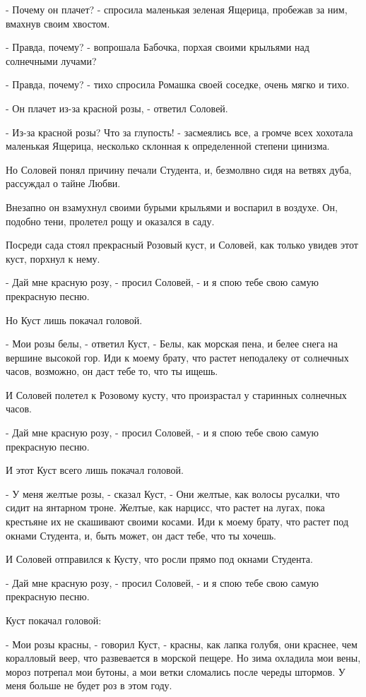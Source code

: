 \documentclass[a4paper]{article}
\theoremstyle{defin}
\theoremstyle{theorem}
\theoremstyle{prop}
\theoremstyle{lemma}
\theoremstyle{ex}
\theoremstyle{col}
\begin{document}
- Почему он плачет? - спросила маленькая зеленая Ящерица, пробежав за ним, вмахнув своим хвостом.

- Правда, почему? - вопрошала Бабочка, порхая своими крыльями над солнечными лучами?

- Правда, почему? - тихо спросила Ромашка своей соседке, очень мягко и тихо.

- Он плачет из-за красной розы, - ответил Соловей.

- Из-за красной розы? Что за глупость! - засмеялись все, а громче всех хохотала маленькая Ящерица, несколько склонная к определенной степени цинизма.

Но Соловей понял причину печали Студента, и, безмолвно сидя на ветвях дуба, рассуждал о тайне Любви.

Внезапно он взамухнул своими бурыми крыльями и воспарил в воздухе. Он, подобно тени, пролетел рощу и оказался в саду.

Посреди сада стоял прекрасный Розовый куст, и Соловей, как только увидев этот куст, порхнул к нему.

- Дай мне красную розу, - просил Соловей, - и я спою тебе свою самую прекрасную песню.

Но Куст лишь покачал головой.

- Мои розы белы, - ответил Куст, - Белы, как морская пена, и белее снега на вершине высокой гор. Иди к моему брату, что растет неподалеку от солнечных часов, возможно, он даст тебе то, что ты ищешь.

И Соловей полетел к Розовому кусту, что произрастал у старинных солнечных часов.

- Дай мне красную розу, - просил Соловей, - и я спою тебе свою самую прекрасную песню.

И этот Куст всего лишь покачал головой.

- У меня желтые розы, - сказал Куст, - Они желтые, как волосы русалки, что сидит на янтарном троне. Желтые, как нарцисс, что растет на лугах, пока крестьяне их не скашивают своими косами. Иди к моему брату, что растет под окнами Студента, и, быть может, он даст тебе, что ты хочешь.

И Соловей отправился к Кусту, что росли прямо под окнами Студента.

- Дай мне красную розу, - просил Соловей, - и я спою тебе свою самую прекрасную песню.

Куст покачал головой:

- Мои розы красны, - говорил Куст, - красны, как лапка голубя, они краснее, чем коралловый веер, что развевается в морской пещере. Но зима охладила мои вены, мороз потрепал мои бутоны, а мои ветки сломались после череды штормов. У меня больше не будет роз в этом году.
\end{document}
